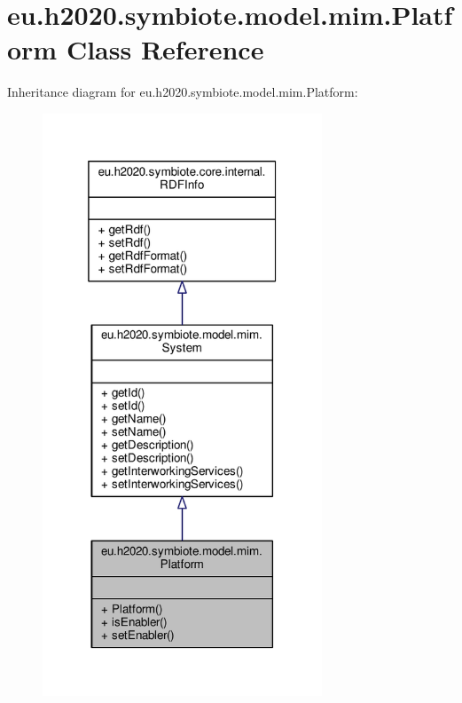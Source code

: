 \hypertarget{classeu_1_1h2020_1_1symbiote_1_1model_1_1mim_1_1Platform}{}\section{eu.\+h2020.\+symbiote.\+model.\+mim.\+Platform Class Reference}
\label{classeu_1_1h2020_1_1symbiote_1_1model_1_1mim_1_1Platform}


Inheritance diagram for eu.\+h2020.\+symbiote.\+model.\+mim.\+Platform\+:\nopagebreak
\begin{figure}[H]
\begin{center}
\leavevmode
\includegraphics[width=236pt]{classeu_1_1h2020_1_1symbiote_1_1model_1_1mim_1_1Platform__inherit__graph}
\end{center}
\end{figure}


